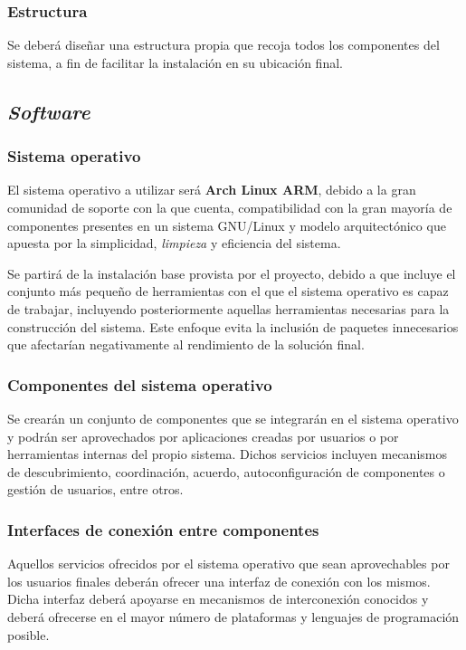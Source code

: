 \subsubsection{Estructura}

Se deberá diseñar una estructura propia que recoja todos los componentes del sistema, a fin de facilitar la instalación en su ubicación final.

\subsection{\textit{Software}}

\subsubsection{Sistema operativo}
\label{problema:sistemaoperativo}

El sistema operativo a utilizar será \textbf{Arch Linux ARM}, debido a la gran comunidad de soporte con la que cuenta, compatibilidad con la gran mayoría de componentes presentes en un sistema GNU/Linux y modelo arquitectónico que apuesta por la simplicidad, \textit{limpieza} y eficiencia del sistema.

Se partirá de la instalación base provista por el proyecto, debido a que incluye el conjunto más pequeño de herramientas con el que el sistema operativo es capaz de trabajar, incluyendo posteriormente aquellas herramientas necesarias para la construcción del sistema. Este enfoque evita la inclusión de paquetes innecesarios que afectarían negativamente al rendimiento de la solución final.

\subsubsection{Componentes del sistema operativo}

Se crearán un conjunto de componentes que se integrarán en el sistema operativo y podrán ser aprovechados por aplicaciones creadas por usuarios o por herramientas internas del propio sistema. Dichos servicios incluyen mecanismos de descubrimiento, coordinación, acuerdo, autoconfiguración de componentes o gestión de usuarios, entre otros.

\subsubsection{Interfaces de conexión entre componentes}

Aquellos servicios ofrecidos por el sistema operativo que sean aprovechables por los usuarios finales deberán ofrecer una interfaz de conexión con los mismos. Dicha interfaz deberá apoyarse en mecanismos de interconexión conocidos y deberá ofrecerse en el mayor número de plataformas y lenguajes de programación posible.

